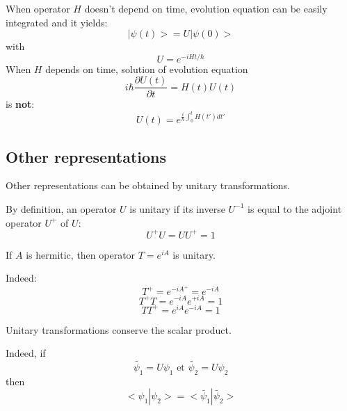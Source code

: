 \documentclass[12pt]{book}
\begin{document}
\begin{rem}
When operator $H$ doesn't depend on time, evolution equation can be easily
integrated and it yields:
\begin{equation}
|\psi(t)\mathrel{>}=U|\psi(0)\mathrel{>}
\end{equation}
with
\begin{equation}
U=e^{-iHt/\hbar}
\end{equation}
When $H$ depends on time, solution of evolution equation 
\begin{equation}
i\hbar \frac{\partial U(t)}{\partial t}=H(t)U(t)
\end{equation}
is {\bf not}:
\begin{equation}
U(t)=e^{\frac{i}{\hbar}\int_0^t H(t')dt'}
\end{equation}
\end{rem}
\subsection{Other representations}\label{secautresrep}
Other representations can be obtained by unitary transformations.
\begin{defn}
By definition\cite{ph:mecaq:Cohen73}, an operator $U$ is unitary if its inverse
$U^{-1}$ is equal to the adjoint operator $U^+$ of $U$:
\begin{equation}
U^+U=UU^+=1
\end{equation}
\end{defn}
\begin{prop}
If $A$ is hermitic, then operator $T=e^{iA}$ is unitary.
\end{prop}
Indeed:
\begin{equation}
T^+=e^{-iA^+}=e^{-iA}
\end{equation}
\begin{equation}
T^+T=e^{-iA}e^{+iA}=1
\end{equation}
\begin{equation}
TT^+=e^{iA}e^{-iA}=1
\end{equation}
\begin{prop}
Unitary transformations conserve the scalar product.
\end{prop}
\begin{pf} Indeed, if
\begin{equation}
\tilde{\psi_1}=U\psi_1 \mbox{ et  } \tilde{\psi_2}=U\psi_2
\end{equation}
then
\begin{equation}
 \mathrel{<} \psi_1|\psi_2\mathrel{>} = \mathrel{<} \tilde{\psi_1}|\tilde{\psi_2}\mathrel{>} 
\end{equation} 
\end{pf}
\end{document}
